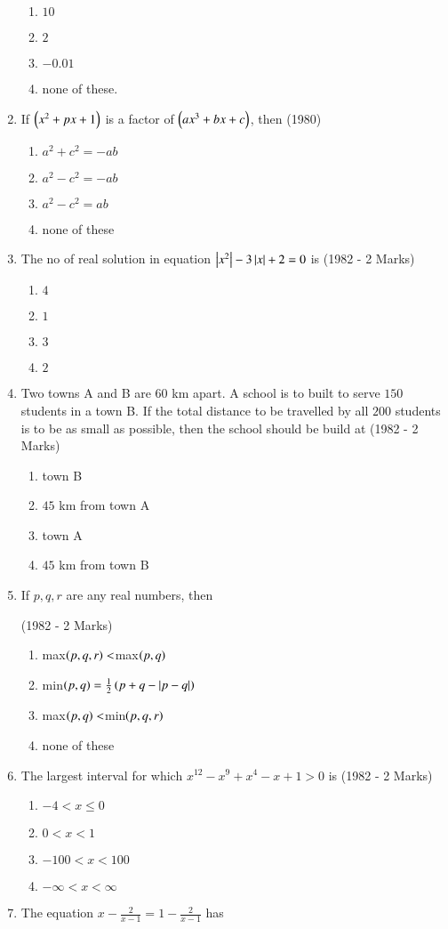 \documentclass[journal,12pt,twocolumn]{IEEEtran}
\theoremstyle{remark}
\begin{document}
\begin{enumerate}
\begin{enumerate} 
\item $10$
\item $2$
\item $-0.01$
\item none of these.
\end{enumerate}
\item If $\left(x^2+px+1\right)$ is a factor of $\left(ax^3+bx+c\right)$, then \hfill (1980)
\begin{enumerate} 
\item $a^2+c^2=-ab$
\item $a^2-c^2=-ab$
\item $a^2-c^2=ab$
\item none of these
\end{enumerate}
\item The no of real solution in equation $\left\vert x^2\right\vert-3\left\vert x\right\vert+2=0$ is \hfill (1982 - 2 Marks)
\begin{enumerate} 
\item $4$
\item $1$
\item $3$
\item $2$
\end{enumerate}
\item Two towns A and B are $60$ km apart. A school is to built to serve $150$ students in a town B. If the total distance to be travelled by all $200$ students is to be as small as possible, then the school should be build at \hfill (1982 - 2 Marks)
\begin{enumerate}
\item town B
\item $45$ km from town A
\item town A
\item $45$ km from town B
\end{enumerate}
\item If $p,q,r$ are any real numbers, then 

\hfill (1982 - 2 Marks)
\begin{enumerate}
\item max$\left(p,q,r\right)<$max$\left(p,q\right)$
\item min$\left(p,q\right)=\frac{1}{2}\left(p+q-\left\vert p-q\right\vert\right)$
\item max$\left(p,q\right)<$min$\left(p,q,r\right)$
\item  none of these
\end{enumerate}
\item The largest interval for which $x^{12}-x^9+x^4-x+1>0$ is \hfill (1982 - 2 Marks)
\begin{enumerate}
\item $-4<x\leq0$
\item $0<x<1$
\item $-100<x<100$
\item $-\infty<x<\infty$
\end{enumerate}
\item The equation $x-\frac{2}{x-1}=1-\frac{2}{x-1}$ has


\end{enumerate}
\end{document}
